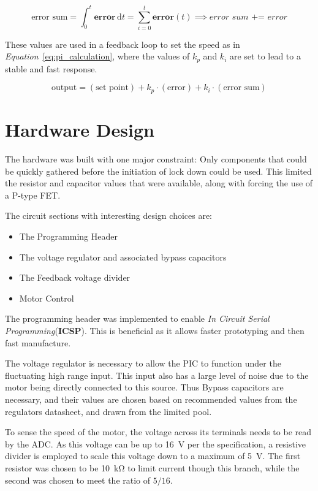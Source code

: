 \documentclass[a4paper]{article}
\begin{document}
\begin{equation} \label{eq:error_sum_equation}
    \text{error sum} = \int_0^t \textbf{error}\,\mathrm{d}t = \sum_{i=0}^t \textbf{error}(t) 
    \implies \textit{error sum += error}
\end{equation}

These values are used in a feedback loop to set the speed as in \textit{Equation}~\ref{eq:pi_calculation}, where the values of $k_p$ and $k_i$ are set to lead to a stable and fast response.  

\begin{equation} \label{eq:pi_calculation}
    \text{output} = (\text{set point}) + k_p\cdot(\text{error}) + k_i\cdot(\text{error sum})
\end{equation}



\section{Hardware Design}
The hardware was built with one major constraint: Only components that could be quickly gathered before the initiation of lock down could be used. This limited the resistor and capacitor values that were available, along with forcing the use of a P-type FET. 

The circuit sections with interesting design choices are:
\begin{itemize}
    \item The Programming Header
    \item The voltage regulator and associated bypass capacitors
    \item The Feedback voltage divider
    \item Motor Control
\end{itemize}

The programming header was implemented to enable \textit{In Circuit Serial Programming}(\textbf{ICSP}). This is beneficial as it allows faster prototyping and then fast manufacture.

The voltage regulator is necessary to allow the PIC to function under the fluctuating high range input. This input also has a large level of noise due to the motor being directly connected to this source. Thus Bypass capacitors are necessary, and their values are chosen based on recommended values from the regulators datasheet, and drawn from the limited pool.

To sense the speed of the motor, the voltage across its terminals needs to be read by the ADC. As this voltage can be up to \SI{16}{\volt} per the specification, a resistive divider is employed to scale this voltage down to a maximum of \SI{5}{\volt}. The first resistor was chosen to be \SI{10}{\kilo\ohm} to limit current though this branch, while the second was chosen to meet the ratio of $5/16$.
\end{document}
